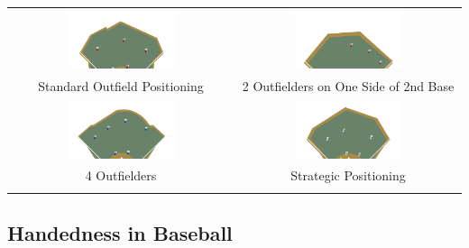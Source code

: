 \documentclass{article}
\begin{document}
\begin{center}
\begin{tabular}{cc}  
    \includegraphics[width=0.5\textwidth]{images/standardOut.png} & 
    \includegraphics[width=0.5\textwidth]{images/3OF2B.png} \\
    Standard Outfield Positioning & 2 Outfielders on One Side of 2nd Base \\
    \includegraphics[width=0.5\textwidth]{images/4OF.png} & 
    \includegraphics[width=0.5\textwidth]{images/strategicOut.png} \\
    4 Outfielders & Strategic Positioning \\
    \cite{mlb2023shifts}
\end{tabular}
\end{center}
\vspace{1.5cm}

\subsection{Handedness in Baseball}
\end{document}

